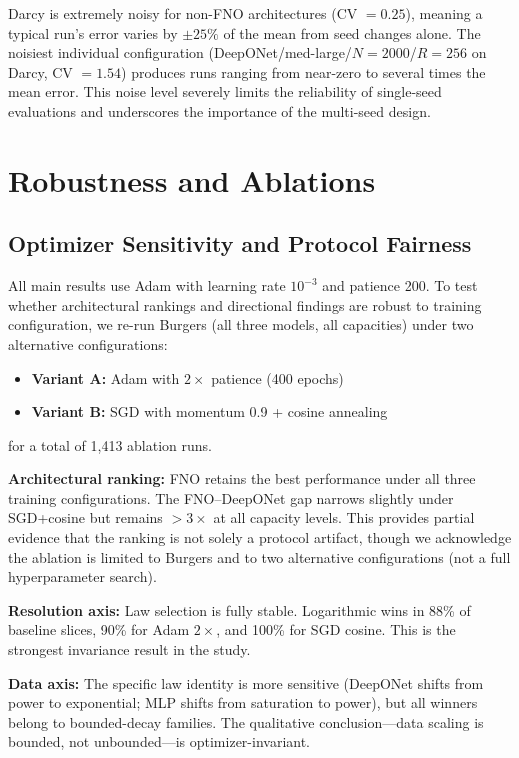 \documentclass[11pt]{article}
\begin{document}
Darcy is extremely noisy for non-FNO architectures (CV $= 0.25$),
meaning a typical run's error varies by $\pm 25\%$ of the mean
from seed changes alone. The noisiest individual configuration
(DeepONet/med-large/$N = 2000$/$R = 256$ on Darcy, CV $= 1.54$)
produces runs ranging from near-zero to several times the mean
error. This noise level severely limits the reliability of
single-seed evaluations and underscores the importance of the
multi-seed design.


\section{Robustness and Ablations}
\label{sec:ablations}

\subsection{Optimizer Sensitivity and Protocol Fairness}
\label{sec:optimizer}

All main results use Adam with learning rate $10^{-3}$ and patience
200. To test whether architectural rankings and directional findings
are robust to training configuration, we re-run Burgers (all three
models, all capacities) under two alternative configurations:
\begin{itemize}[leftmargin=*,itemsep=2pt]
  \item \textbf{Variant A:} Adam with $2\times$ patience (400 epochs)
  \item \textbf{Variant B:} SGD with momentum 0.9 + cosine annealing
\end{itemize}
for a total of 1{,}413 ablation runs.

\textbf{Architectural ranking:} FNO retains the best performance
under all three training configurations. The FNO--DeepONet gap
narrows slightly under SGD+cosine but remains $>3\times$ at all
capacity levels. This provides partial evidence that the ranking
is not solely a protocol artifact, though we acknowledge the
ablation is limited to Burgers and to two alternative configurations
(not a full hyperparameter search).

\textbf{Resolution axis:} Law selection is fully stable.
Logarithmic wins in 88\% of baseline slices, 90\% for Adam
$2\times$, and 100\% for SGD cosine. This is the strongest
invariance result in the study.

\textbf{Data axis:} The specific law identity is more sensitive
(DeepONet shifts from power to exponential; MLP shifts from
saturation to power), but all winners belong to bounded-decay
families. The qualitative conclusion---data scaling is bounded,
not unbounded---is optimizer-invariant.
\end{document}
